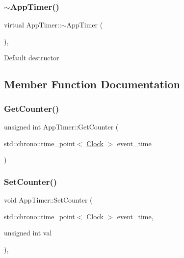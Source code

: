 \mbox{\label{classAppTimer_a5ef0c072a0591cf5a3bcc07edbd3577f}} 
\subsubsection{\texorpdfstring{$\sim$\+App\+Timer()}{~AppTimer()}}
{\footnotesize\ttfamily virtual App\+Timer\+::$\sim$\+App\+Timer (\begin{DoxyParamCaption}{ }\end{DoxyParamCaption})\hspace{0.3cm}{\ttfamily [inline]}, {\ttfamily [virtual]}}

Default destructor 

\subsection{Member Function Documentation}
\mbox{\label{classAppTimer_ab9bb2b5f283b02d6d2292e064ddbd2ab}} 
\subsubsection{\texorpdfstring{Get\+Counter()}{GetCounter()}}
{\footnotesize\ttfamily unsigned int App\+Timer\+::\+Get\+Counter (\begin{DoxyParamCaption}\item[{std\+::chrono\+::time\+\_\+point$<$ \mbox{\hyperlink{universe_8h_a0ef8d951d1ca5ab3cfaf7ab4c7a6fd80}{Clock}} $>$}]{event\+\_\+time }\end{DoxyParamCaption})\hspace{0.3cm}{\ttfamily [inline]}}

\mbox{\label{classAppTimer_a77d5d447d6b136a35304b0571a166ddc}} 
\subsubsection{\texorpdfstring{Set\+Counter()}{SetCounter()}}
{\footnotesize\ttfamily void App\+Timer\+::\+Set\+Counter (\begin{DoxyParamCaption}\item[{std\+::chrono\+::time\+\_\+point$<$ \mbox{\hyperlink{universe_8h_a0ef8d951d1ca5ab3cfaf7ab4c7a6fd80}{Clock}} $>$}]{event\+\_\+time,  }\item[{unsigned int}]{val }\end{DoxyParamCaption})\hspace{0.3cm}{\ttfamily [inline]}, {\ttfamily [virtual]}}



